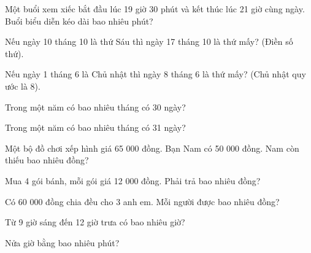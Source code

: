 \begin{ex}
Một buổi xem xiếc bắt đầu lúc 19 giờ 30 phút và kết thúc lúc 21 giờ cùng ngày. Buổi biểu diễn kéo dài bao nhiêu phút?
\end{ex}

\begin{ex}
Nếu ngày 10 tháng 10 là thứ Sáu thì ngày 17 tháng 10 là thứ mấy? (Điền số thứ).
\end{ex}

\begin{ex}
Nếu ngày 1 tháng 6 là Chủ nhật thì ngày 8 tháng 6 là thứ mấy? (Chủ nhật quy ước là 8).
\end{ex}

\begin{ex}
Trong một năm có bao nhiêu tháng có 30 ngày?
\end{ex}

\begin{ex}
Trong một năm có bao nhiêu tháng có 31 ngày?
\end{ex}

\begin{ex}
Một bộ đồ chơi xếp hình giá 65 000 đồng. Bạn Nam có 50 000 đồng. Nam còn thiếu bao nhiêu đồng?
\end{ex}

\begin{ex}
Mua 4 gói bánh, mỗi gói giá 12 000 đồng. Phải trả bao nhiêu đồng?
\end{ex}

\begin{ex}
Có 60 000 đồng chia đều cho 3 anh em. Mỗi người được bao nhiêu đồng?
\end{ex}

\begin{ex}
Từ 9 giờ sáng đến 12 giờ trưa có bao nhiêu giờ?
\end{ex}

\begin{ex}
Nửa giờ bằng bao nhiêu phút?
\end{ex}

